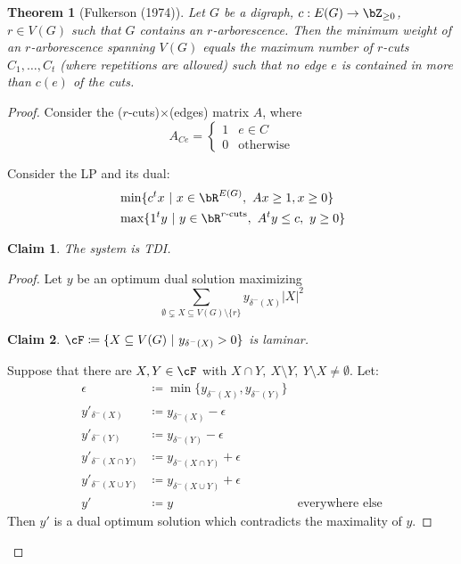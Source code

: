 \documentclass[11pt, a4paper]{article}
\newcommand{\abs}[1]{\left\lvert#1\right\rvert}
\newcommand{\set}[1]{\{#1\}}
\newtheorem{theorem}{Theorem}[section]
\newtheorem*{claim}{Claim}
\theoremstyle{remark}
\theoremstyle{definition}
\begin{document}
\begin{theorem}[Fulkerson (1974)]
	Let $G$ be a digraph, $c: E(G)\to\bZ_{\geq0}$, $r\in V(G)$ such that
	$G$ contains an $r$-arborescence. Then the minimum weight of an $r$-arborescence
	spanning $V(G)$ equals the maximum number of $r$-cuts $C_1,\ldots,C_t$
	(where repetitions are allowed) such that no edge $e$ is contained in more
	than $c(e)$ of the cuts.
\end{theorem}
\begin{proof}
	Consider the ($r$-cuts)$\times$(edges) matrix $A$, where
	\[A_{Ce}=\begin{cases}
			1 & e\in C           \\
			0 & \text{otherwise}
		\end{cases}\]

	Consider the LP and its dual:
	\begin{align*}
		 & \min\set{c^tx\ |\ x\in \bR^{E(G)},\ Ax\geq 1, x\geq0}            \\
		 & \max\set{1^ty\ |\ y\in\bR^{r\text{-cuts}},\ A^ty\leq c,\ y\geq0}
	\end{align*}
	\begin{claim}
		The system is TDI.
	\end{claim}
	\begin{proof}
		Let $y$ be an optimum dual solution maximizing
		\[\sum_{\emptyset\subsetneq X\subseteq V(G)\setminus\set{r}}y_{\delta^-(X)}\abs{X}^2\]
		\begin{claim}
			$\cF\coloneqq \set{X\subseteq V(G)\  |\ y_{\delta^-(X)}>0}$ is laminar.
		\end{claim}
		Suppose that there are $X,Y\in\cF$ with $X\cap Y,\ X\setminus Y,\ Y\setminus X
			\neq\emptyset$. Let:
		\begin{align*}
			\epsilon               & \coloneqq \min\set{y_{\delta^-(X)},y_{\delta^-(Y)}}                          \\
			y'_{\delta^-(X)}       & \coloneqq y_{\delta^-(X)}-\epsilon                                           \\
			y'_{\delta^-(Y)}       & \coloneqq y_{\delta^-(Y)}-\epsilon                                           \\
			y'_{\delta^-(X\cap Y)} & \coloneqq y_{\delta^-(X\cap Y)}+\epsilon                                     \\
			y'_{\delta^-(X\cup Y)} & \coloneqq y_{\delta^-(X\cup Y)}+\epsilon                                     \\
			y'                     & \coloneqq y                                         & \text{everywhere else}
		\end{align*}
		Then $y'$ is a dual optimum solution which contradicts the maximality of $y$.


\end{proof}
\end{proof}
\end{document}
